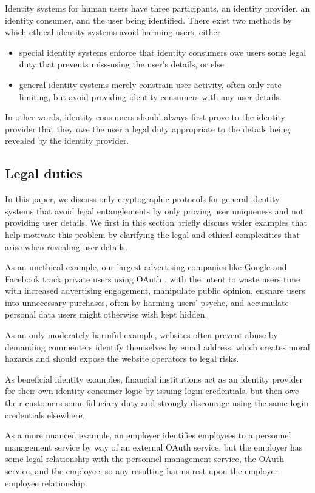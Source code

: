 Identity systems for human users have three participants, an identity provider, an identity consumer, and the user being identified.  There exist two methods by which ethical identity systems avoid harming users, either 
\begin{itemize}
\item special identity systems enforce that identity consumers owe users some legal duty that prevents miss-using the user's details, or else
\item general identity systems merely constrain user activity, often only rate limiting, but avoid providing identity consumers with any user details.
\end{itemize}
In other words, identity consumers should always first prove to the identity provider that they owe the user a legal duty appropriate to the details being revealed by the identity provider.

\subsection{Legal duties}

In this paper, we discuss only cryptographic protocols for general identity systems that avoid legal entanglements by only proving user uniqueness and not providing user details.  We first in this section briefly discuss wider examples that help motivate this problem by clarifying the legal and ethical complexities that arise when revealing user details.

As an unethical example, our largest advertising companies like Google and Facebook track private users using OAuth \cite{oauth}, with the intent to waste users time with increased advertising engagement, manipulate public opinion, ensnare users into unnecessary purchases, often by harming users' psyche, and accumulate personal data users might otherwise wish kept hidden.

As an only moderately harmful example, websites often prevent abuse by demanding commenters identify themselves by email address, which creates moral hazards and should expose the website operators to legal risks.

As beneficial identity examples, financial institutions act as an identity provider for their own identity consumer logic by issuing login credentials, but then owe their customers some fiduciary duty and strongly discourage using the same login credentials elsewhere.  

As a more nuanced example, an employer identifies employees to a personnel management service by way of an external OAuth service, but the employer has some legal relationship with the personnel management service, the OAuth service, and the employee, so any resulting harms rest upon the employer-employee relationship.  

